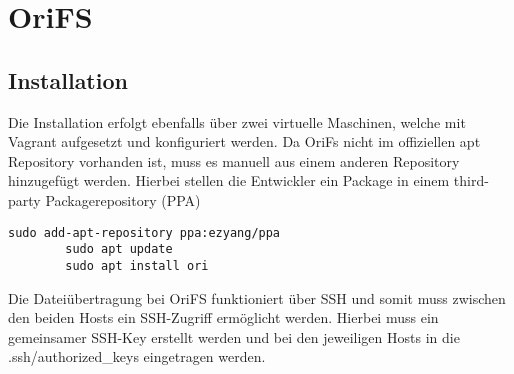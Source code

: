 \section{OriFS}
\subsection{Installation}
	Die Installation erfolgt ebenfalls über zwei virtuelle Maschinen, welche mit Vagrant aufgesetzt und konfiguriert werden. Da OriFs nicht im offiziellen apt Repository vorhanden ist, muss es manuell aus einem anderen Repository hinzugefügt werden. Hierbei stellen die Entwickler ein Package in einem third-party Packagerepository (PPA)
	\begin{lstlisting}[style=Java, caption=Erstellen einer Datei im Shared folder]
		sudo add-apt-repository ppa:ezyang/ppa
		sudo apt update
		sudo apt install ori 
	\end{lstlisting}
	Die Dateiübertragung bei OriFS funktioniert über SSH und somit muss zwischen den beiden Hosts ein SSH-Zugriff ermöglicht werden. Hierbei muss ein gemeinsamer SSH-Key erstellt werden und bei den jeweiligen Hosts in die .ssh/authorized\_keys eingetragen werden.
	
